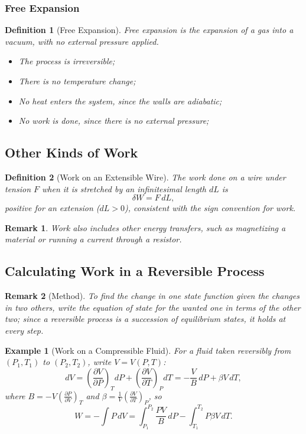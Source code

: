 \documentclass{article}
\newtheorem{definition}{Definition}
\newtheorem{example}{Example}
\newtheorem{remark}{Remark}
\begin{document}
\subsubsection{Free Expansion}
\begin{definition}[Free Expansion]
    \label{def:free-expansion}
    Free expansion is the expansion of a gas into a vacuum, with no external pressure applied.
    \begin{itemize}
        \item The process is irreversible;
        \item There is no temperature change;
        \item No heat enters the system, since the walls are adiabatic;
        \item No work is done, since there is no external pressure;
    \end{itemize}   
\end{definition}

\subsection{Other Kinds of Work}
\begin{definition}[Work on an Extensible Wire]
    The work done on a wire under tension $F$ when it is stretched by an infinitesimal length $dL$ is
    \begin{equation}
        \label{eq:wire-work}
        \delta W = F\,dL,
    \end{equation}
    positive for an extension ($dL > 0$), consistent with the sign convention for work.
\end{definition}
\begin{remark}
    Work also includes other energy transfers, such as magnetizing a material or running a current through a resistor.
\end{remark}

\subsection{Calculating Work in a Reversible Process}
\begin{remark}[Method]
    To find the change in one state function given the changes in two others, write the equation of state for the wanted one in terms of the other two; since a reversible process is a succession of equilibrium states, it holds at every step.
\end{remark}
\begin{example}[Work on a Compressible Fluid]
    For a fluid taken reversibly from $(P_1, T_1)$ to $(P_2, T_2)$, write $V = V(P, T)$:
    \[dV = \left(\frac{\partial V}{\partial P}\right)_T dP + \left(\frac{\partial V}{\partial T}\right)_P dT = -\frac{V}{B}\,dP + \beta V\,dT,\]
    where $B = -V\left(\frac{\partial P}{\partial V}\right)_T$ and $\beta = \frac{1}{V}\left(\frac{\partial V}{\partial T}\right)_P$, so
    \[W = -\int P\,dV = \int_{P_1}^{P_2}\frac{PV}{B}\,dP - \int_{T_1}^{T_2}P\beta V\,dT.\]
\end{example}
\end{document}
